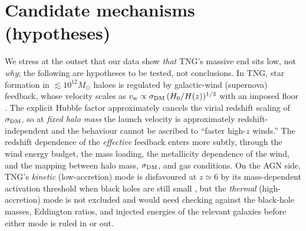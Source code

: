 \documentclass[twocolumn]{aastex631}
\begin{document}
\section{Candidate mechanisms (hypotheses)}
We stress at the outset that our data show \emph{that} TNG's massive end sits low, not \emph{why}; the following are hypotheses to be tested, not conclusions. In TNG, star formation in $\lesssim10^{12}M_\odot$ haloes is regulated by galactic-wind (supernova) feedback, whose velocity scales as $v_{\rm w}\propto\sigma_{\rm DM}\,(H_0/H(z))^{1/3}$ with an imposed floor \citep{pillepich18}. The explicit Hubble factor approximately cancels the virial redshift scaling of $\sigma_{\rm DM}$, so at \emph{fixed halo mass} the launch velocity is approximately redshift-independent and the behaviour cannot be ascribed to ``faster high-$z$ winds.'' The redshift dependence of the \emph{effective} feedback enters more subtly, through the wind energy budget, the mass loading, the metallicity dependence of the wind, and the mapping between halo mass, $\sigma_{\rm DM}$, and gas conditions. On the AGN side, TNG's \emph{kinetic} (low-accretion) mode is disfavoured at $z\simeq6$ by its mass-dependent activation threshold when black holes are still small \citep{weinberger17}, but the \emph{thermal} (high-accretion) mode is not excluded and would need checking against the black-hole masses, Eddington ratios, and injected energies of the relevant galaxies before either mode is ruled in or out.
\end{document}
